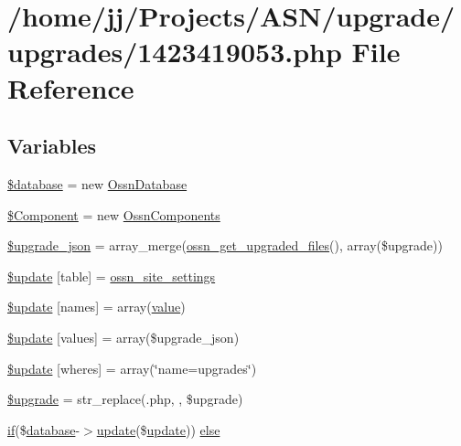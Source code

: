 \hypertarget{1423419053_8php}{}\section{/home/jj/\+Projects/\+A\+S\+N/upgrade/upgrades/1423419053.php File Reference}
\label{1423419053_8php}
\subsection*{Variables}
\begin{DoxyCompactItemize}
\item 
\hyperlink{1423419053_8php_a7691c0162d89de0b6ba47edcd8ba8878}{\$database} = new \hyperlink{class_ossn_database}{Ossn\+Database}
\item 
\hyperlink{1423419053_8php_a02ea7567c10bfaae8b945a600a9f2de1}{\$\+Component} = new \hyperlink{class_ossn_components}{Ossn\+Components}
\item 
\hyperlink{1423419053_8php_a512525d0f5eb608ac72ca7b85e5fbf65}{\$upgrade\+\_\+json} = array\+\_\+merge(\hyperlink{ossn_8lib_8upgrade_8php_a984d0f1ee4273d739939d28d00a8bedb}{ossn\+\_\+get\+\_\+upgraded\+\_\+files}(), array(\$upgrade))
\item 
\hyperlink{1423419053_8php_aee7ba5985ddf023a93862ab77e9718f9}{\$update} \mbox{[}\textquotesingle{}table\textquotesingle{}\mbox{]} = \textquotesingle{}\hyperlink{ossn_8lib_8system_8php_a610e2045b8a86c09f777b4d82e24e34c}{ossn\+\_\+site\+\_\+settings}\textquotesingle{}
\item 
\hyperlink{1423419053_8php_abcf5ad2e4fef35de04bef0168cc91ddc}{\$update} \mbox{[}\textquotesingle{}names\textquotesingle{}\mbox{]} = array(\textquotesingle{}\hyperlink{fullpage_2plugin_8min_8js_ac56c57897e10f699d124e0103921aa20}{value}\textquotesingle{})
\item 
\hyperlink{1423419053_8php_ac82a75b4c6df37380ff77c88f041785e}{\$update} \mbox{[}\textquotesingle{}values\textquotesingle{}\mbox{]} = array(\$upgrade\+\_\+json)
\item 
\hyperlink{1423419053_8php_aacde4479a904b32d0f24dea4e01f148c}{\$update} \mbox{[}\textquotesingle{}wheres\textquotesingle{}\mbox{]} = array(\char`\"{}name=\textquotesingle{}upgrades\textquotesingle{}\char`\"{})
\item 
\hyperlink{1423419053_8php_a9084097ce600d3cc7a79a20ecaea9906}{\$upgrade} = str\+\_\+replace(\textquotesingle{}.php\textquotesingle{}, \textquotesingle{}\textquotesingle{}, \$upgrade)
\item 
\hyperlink{jquery_8tokeninput_8js_ad8dd46a3cbc004569e34401e9e71771a}{if}(\$\hyperlink{ossn_8config_8db_8example_8php_a4e0ca996705612048240f76ff8d4da95}{database}-\/$>$\hyperlink{_chart_8_doughnut_8js_ad58a8121caa8678969d1ff32848a77c4}{update}(\$\hyperlink{_chart_8_doughnut_8js_ad58a8121caa8678969d1ff32848a77c4}{update})) \hyperlink{1423419053_8php_aa7c58ee9f19ec0c0f3a1951839273e79}{else}
\end{DoxyCompactItemize}


